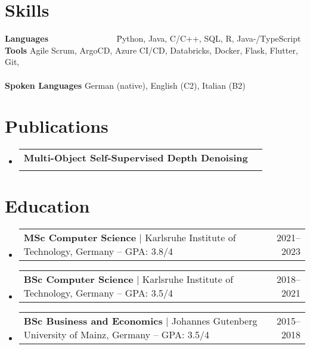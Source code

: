 \documentclass[letterpaper,11pt]{article}
\makeatletter
\newcommand{\resumeProjectHeading}[2]{
    \item
    \begin{tabular*}{0.97\textwidth}{l@{\extracolsep{\fill}}r}
      \small#1 & #2 \\
    \end{tabular*}\vspace{-7pt}
}
\newcommand{\resumeSubHeadingListStart}{\begin{itemize}[leftmargin=0.15in, label={}]}
\newcommand{\resumeSubHeadingListEnd}{\end{itemize}}
\makeatother
\begin{document}
\section{Skills}
\begin{itemize}[leftmargin=0.15in, label={}]
	\small{\item{
	      \begin{tabbing}
		      \textbf{Languages} ~~~~~~~~~~~~~~~ \={Python, Java, C/C++, SQL, R, Java-/TypeScript} \\
		      \textbf{Tools} \> {Agile Scrum, ArgoCD, Azure CI/CD, Databricks, Docker, Flask, Flutter, Git,} \\
		       \\
		      \textbf{Spoken Languages} \> {German (native), English (C2), Italian (B2)}\\
	      \end{tabbing}
	      }}
\end{itemize}

\vspace{-12pt}

\section{Publications}
\resumeSubHeadingListStart
\resumeProjectHeading{\textbf{Multi-Object Self-Supervised Depth Denoising} \space [Kienle \& Petri, 2023, \href{https://arxiv.org/abs/2305.05778}{{arXiv: 2305.05778}}]}\\
\resumeSubHeadingListEnd
\vspace{0px}


\section{Education}
\resumeSubHeadingListStart
\resumeProjectHeading
{\textbf{MSc Computer Science} \space $|$ \space Karlsruhe Institute of Technology, Germany -- GPA: 3.8/4}{2021--2023}
\resumeProjectHeading
{\textbf{BSc Computer Science} \space $|$ \space Karlsruhe Institute of Technology, Germany -- GPA: 3.5/4}{2018--2021}
\resumeProjectHeading
{\textbf{BSc Business and Economics} \space $|$ \space Johannes Gutenberg University of Mainz, Germany -- GPA: 3.5/4}{2015--2018}
\resumeSubHeadingListEnd

\end{document}
